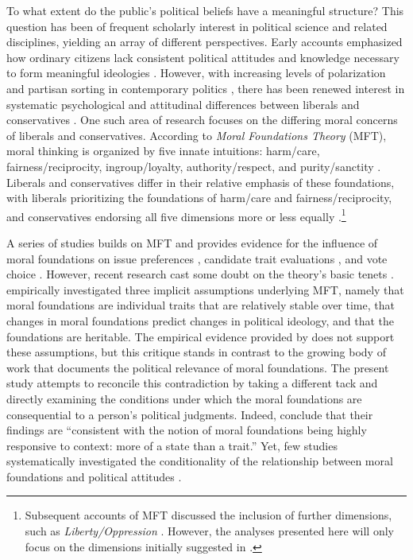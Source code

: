 \documentclass[12pt]{article}
\begin{document}
To what extent do the public's political beliefs have a meaningful structure? This question has been of frequent scholarly interest in political science and related disciplines, yielding an array of different perspectives. Early accounts emphasized how ordinary citizens lack consistent political attitudes and knowledge necessary to form meaningful ideologies \citep[e.g.][]{converse1964nature}. However, with increasing levels of polarization and partisan sorting in contemporary politics \citep{iyengar2015fear}, there has been renewed interest in systematic psychological and attitudinal differences between liberals and conservatives \citep{jost2006end}. One such area of research focuses on the differing moral concerns of liberals and conservatives. According to \textit{Moral Foundations Theory} (MFT), moral thinking is organized by five innate intuitions: harm/care, fairness/reciprocity, ingroup/loyalty, authority/respect, and purity/sanctity \citep{haidt2008moral,graham2011mapping}. Liberals and conservatives differ in their relative emphasis of these foundations, with liberals prioritizing the foundations of harm/care and fairness/reciprocity, and conservatives endorsing all five dimensions more or less equally \citep{graham2009liberals}.\footnote{Subsequent accounts of MFT discussed the inclusion of further dimensions, such as \textit{Liberty/Oppression} \citep[c.f.,][]{graham2013moral,haidt2012righteous}. However, the analyses presented here will only focus on the dimensions initially suggested in \citet{haidt2008moral}.}

A series of studies builds on MFT and provides evidence for the influence of moral foundations on issue preferences \citep{koleva2012tracing, kertzer2014moral, low2015moral, clifford2015concerns}, candidate trait evaluations \citep{clifford2014linking}, and vote choice \citep{iyer2010beyond, franks2015using}. However, recent research cast some doubt on the theory's basic tenets \citep[e.g.,][]{suhler2011can}. \citet{smith2016intuitive} empirically investigated three implicit assumptions underlying MFT, namely that moral foundations are individual traits that are relatively stable over time, that changes in moral foundations predict changes in political ideology, and that the foundations are heritable. The empirical evidence provided by \citet{smith2016intuitive} does not support these assumptions, but this critique stands in contrast to the growing body of work that documents the political relevance of moral foundations. The present study attempts to reconcile this contradiction by taking a different tack and directly examining the conditions under which the moral foundations are consequential to a person's political judgments. Indeed, \citet{smith2016intuitive} conclude that their findings are ``consistent with the notion of moral foundations being highly responsive to context: more of a state than a trait.'' Yet, few studies systematically investigated the conditionality of the relationship between moral foundations and political attitudes \citep[see][for a notable exception]{clifford2015concerns}.
\end{document}
